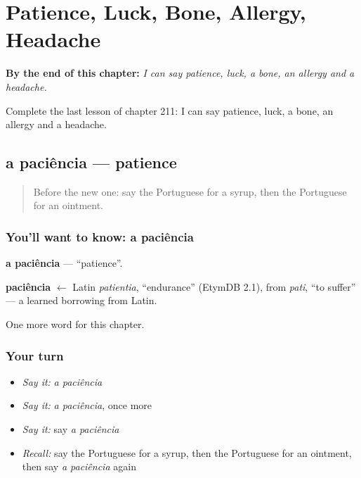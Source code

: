 
\chapter{Patience, Luck, Bone, Allergy, Headache}
\label{ch:pt-patience-luck-bone-allergy-headache}

\begin{chapteropening}
\textbf{By the end of this chapter:} \emph{I can say patience, luck, a bone, an allergy and a headache.}

Complete the last lesson of chapter 211: I can say patience, luck, a bone, an allergy and a headache.
\end{chapteropening}

\section[a paciência]{a paciência — patience}

\label{lesson:PT-C211-paciencia}



\begin{quote}
Before the new one: say the Portuguese for a syrup, then the Portuguese for an ointment.
\end{quote}

\subsection*{You'll want to know: a paciência}
\textbf{a paciência} — \textquotedblleft{}patience\textquotedblright{}.

\begin{cousinweb}
\textbf{paciência} $\leftarrow$ Latin \emph{patientia}, \textquotedblleft{}endurance\textquotedblright{} (EtymDB 2.1), from \emph{pati}, \textquotedblleft{}to suffer\textquotedblright{} — a learned borrowing from Latin.
\end{cousinweb}

\begin{grammarlens}[title={What you've built}]
One more word for this chapter.
\end{grammarlens}

\subsection*{Your turn}
\begin{itemize}
\raggedright
  \item \emph{Say it:} \emph{a paciência}
  \item \emph{Say it:} \emph{a paciência}, once more
  \item \emph{Say it:} say \emph{a paciência}
  \item \emph{Recall:} say the Portuguese for a syrup, then the Portuguese for an ointment, then say \emph{a paciência} again
\end{itemize}

